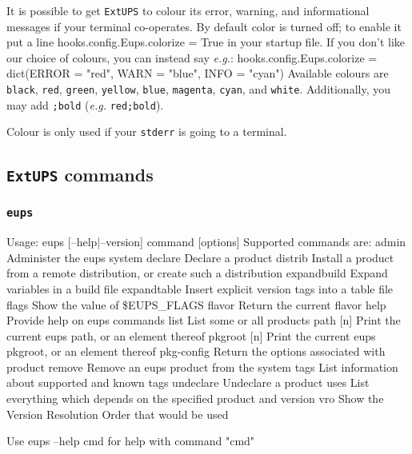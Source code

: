 \documentclass{article}
\newcommand{\code}[1]{\texttt{#1}}
\newcommand{\eups}{\code{ExtUPS}\xspace}
\let\overbatim=\verbatim
\let\oendverbatim=\endverbatim
\renewenvironment{verbatim}
{\center\minipage{16cm}\overbatim}
{\oendverbatim\endminipage\endcenter}
\begin{document}
It is possible to get \eups to colour its error, warning, and informational messages if your
terminal co-operates.  By default color is turned off; to enable it put a line
\begin{verbatim}
hooks.config.Eups.colorize = True
\end{verbatim}
in your startup file.  If you don't like our choice of colours, you can instead say \textit{e.g.}:
\begin{verbatim}
hooks.config.Eups.colorize = dict(ERROR = "red", WARN = "blue", INFO = "cyan")
\end{verbatim}
Available colours are \code{black}, \code{red}, \code{green}, \code{yellow}, \code{blue}, \code{magenta},
\code{cyan}, and \code{white}.  Additionally, you may add \code{;bold} (\textit{e.g.} \code{red;bold}).

Colour is only used if your \code{stderr} is going to a terminal.


\subsection{\eups commands}

\subsubsection{\code{eups}}
\begin{verbatim}
Usage:
        eups [--help|--version] command [options]
Supported commands are:
        admin           Administer the eups system
        declare         Declare a product
        distrib         Install a product from a remote distribution,
                        or create such a distribution
        expandbuild     Expand variables in a build file
        expandtable     Insert explicit version tags into a table file
        flags           Show the value of \$EUPS_FLAGS
        flavor          Return the current flavor
        help            Provide help on eups commands
        list            List some or all products
        path [n]        Print the current eups path, or an element thereof
        pkgroot [n]     Print the current eups pkgroot, or an element thereof
        pkg-config      Return the options associated with product
        remove          Remove an eups product from the system
        tags            List information about supported and known tags
        undeclare       Undeclare a product
        uses            List everything which depends on the specified product
                        and version
        vro             Show the Version Resolution Order that would be used

Use
        eups --help cmd
for help with command "cmd"
\end{verbatim}
\end{document}
